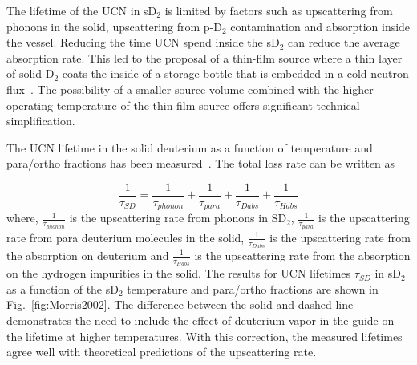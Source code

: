 The lifetime of the UCN in sD$_2$ is limited by factors such as
 upscattering from phonons in the solid, upscattering from p-D$_2$
 contamination and absorption inside the vessel.  Reducing the time
 UCN spend inside the sD$_2$ can reduce the average absorption
 rate. This led to the proposal of a thin-film source where a thin
 layer of solid D$_2$ coats the inside of a storage bottle that is
 embedded in a cold neutron flux~\cite{Golub83}. The possibility
 of a smaller source volume combined with the higher operating
 temperature of the thin film source offers significant technical
 simplification.

The UCN lifetime in the solid deuterium as a function of temperature
and para/ortho fractions has been measured~\cite{Morris2002}. The
total loss rate can be written as

\begin{equation}
\label{eqn:SD_lifetime}
\frac{1}{\tau_{SD}}=\frac{1}{\tau_{phonon}}+\frac{1}{\tau_{para}}+\frac{1}{\tau_{Dabs}}+ \frac{1}{\tau_{Habs}}
\end{equation}
where, $\frac{1}{\tau_{phonon}}$ is the upscattering rate from phonons
in SD$_2$, $\frac{1}{\tau_{para}}$ is the upscattering rate from para
deuterium molecules in the solid, $\frac{1}{\tau_{Dabs}}$ is the
upscattering rate from the absorption on deuterium and
$\frac{1}{\tau_{Habs}}$ is the upscattering rate from the absorption
on the hydrogen impurities in the solid. The results for UCN lifetimes
$\tau_{SD}$ in sD$_2$ as a function of the sD$_2$ temperature and
para/ortho fractions are shown in Fig.~\ref{fig:Morris2002}. The
difference between the solid and dashed line demonstrates the need to
include the effect of deuterium vapor in the guide on the lifetime at
higher temperatures. With this correction, the measured lifetimes
agree well with theoretical predictions of the upscattering rate.






